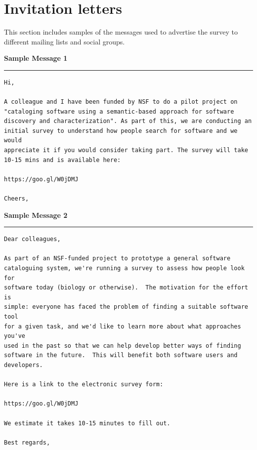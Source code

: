 \documentclass{casicswhitepaper}
\begin{document}
\clearpage



\section{Invitation letters}
\label{apdx:invitations}

This section includes samples of the messages used to advertise the survey to different mailing lists and social groups.


\vspace*{2em}
\textbf{Sample Message 1}
\hrule

\small
\begin{verbatim}
Hi,

A colleague and I have been funded by NSF to do a pilot project on
"cataloging software using a semantic-based approach for software
discovery and characterization". As part of this, we are conducting an
initial survey to understand how people search for software and we would
appreciate it if you would consider taking part. The survey will take
10-15 mins and is available here:

https://goo.gl/W0jDMJ

Cheers,
\end{verbatim}
\normalsize


\vspace*{2em}
\textbf{Sample Message 2}
\hrule

\small
\begin{verbatim}
Dear colleagues,

As part of an NSF-funded project to prototype a general software
cataloguing system, we're running a survey to assess how people look for
software today (biology or otherwise).  The motivation for the effort is
simple: everyone has faced the problem of finding a suitable software tool
for a given task, and we'd like to learn more about what approaches you've
used in the past so that we can help develop better ways of finding
software in the future.  This will benefit both software users and
developers.

Here is a link to the electronic survey form:

https://goo.gl/W0jDMJ

We estimate it takes 10-15 minutes to fill out.

Best regards,
\end{verbatim}
\normalsize

\clearpage


\end{document}
